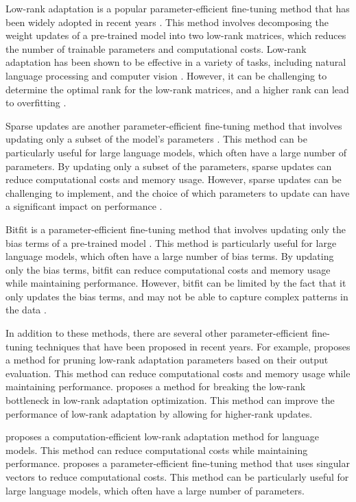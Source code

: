 \documentclass[11pt]{article}
\begin{document}
Low-rank adaptation is a popular parameter-efficient fine-tuning method that has been widely adopted in recent years \cite{ref118}. This method involves decomposing the weight updates of a pre-trained model into two low-rank matrices, which reduces the number of trainable parameters and computational costs. Low-rank adaptation has been shown to be effective in a variety of tasks, including natural language processing and computer vision \cite{ref119}. However, it can be challenging to determine the optimal rank for the low-rank matrices, and a higher rank can lead to overfitting \cite{ref120}.

Sparse updates are another parameter-efficient fine-tuning method that involves updating only a subset of the model's parameters \cite{ref121}. This method can be particularly useful for large language models, which often have a large number of parameters. By updating only a subset of the parameters, sparse updates can reduce computational costs and memory usage. However, sparse updates can be challenging to implement, and the choice of which parameters to update can have a significant impact on performance \cite{ref122}.

Bitfit is a parameter-efficient fine-tuning method that involves updating only the bias terms of a pre-trained model \cite{ref123}. This method is particularly useful for large language models, which often have a large number of bias terms. By updating only the bias terms, bitfit can reduce computational costs and memory usage while maintaining performance. However, bitfit can be limited by the fact that it only updates the bias terms, and may not be able to capture complex patterns in the data \cite{ref124}.

In addition to these methods, there are several other parameter-efficient fine-tuning techniques that have been proposed in recent years. For example, \cite{ref125} proposes a method for pruning low-rank adaptation parameters based on their output evaluation. This method can reduce computational costs and memory usage while maintaining performance. \cite{ref126} proposes a method for breaking the low-rank bottleneck in low-rank adaptation optimization. This method can improve the performance of low-rank adaptation by allowing for higher-rank updates.

\cite{ref127} proposes a computation-efficient low-rank adaptation method for language models. This method can reduce computational costs while maintaining performance. \cite{ref128} proposes a parameter-efficient fine-tuning method that uses singular vectors to reduce computational costs. This method can be particularly useful for large language models, which often have a large number of parameters.
\end{document}
